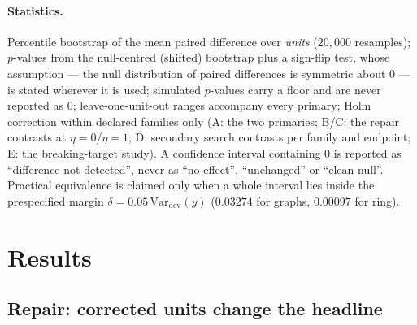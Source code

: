 \documentclass[11pt]{article}
\newcommand{\dev}{\mathrm{dev}}
\begin{document}
\paragraph{Statistics.} Percentile bootstrap of the mean paired difference over
\emph{units} ($20{,}000$ resamples); $p$-values from the null-centred (shifted) bootstrap
plus a sign-flip test, whose assumption --- the null distribution of paired differences is
symmetric about $0$ --- is stated wherever it is used; simulated $p$-values carry a floor
and are never reported as $0$; leave-one-unit-out ranges accompany every primary; Holm
correction within declared families only (A: the two primaries; B/C: the repair contrasts
at $\eta{=}0$/$\eta{=}1$; D: secondary search contrasts per family and endpoint; E: the
breaking-target study). A confidence interval containing $0$ is reported as ``difference
not detected'', never as ``no effect'', ``unchanged'' or ``clean null''. Practical
equivalence is claimed only when a whole interval lies inside the prespecified margin
$\delta=0.05\,\mathrm{Var}_{\dev}(y)$ ($0.03274$ for graphs, $0.00097$ for ring).

\section{Results}

\subsection{Repair: corrected units change the headline}
\label{sec:repair-results}
\end{document}
